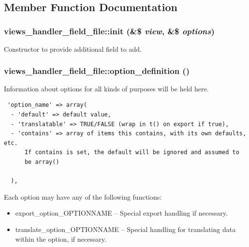 \subsection{Member Function Documentation}
\hypertarget{classviews__handler__field__file_a0c76118aaf12d0938111d093411c016}{
\subsubsection[{init}]{\setlength{\rightskip}{0pt plus 5cm}views\_\-handler\_\-field\_\-file::init (\&\$ {\em view}, \/  \&\$ {\em options})}}
\label{classviews__handler__field__file_a0c76118aaf12d0938111d093411c016}


Constructor to provide additional field to add. \hypertarget{classviews__handler__field__file_0bf24a6e9139daa5206f209b39aea824}{
\subsubsection[{option\_\-definition}]{\setlength{\rightskip}{0pt plus 5cm}views\_\-handler\_\-field\_\-file::option\_\-definition ()}}
\label{classviews__handler__field__file_0bf24a6e9139daa5206f209b39aea824}


Information about options for all kinds of purposes will be held here. 

\begin{Code}\begin{verbatim} 'option_name' => array(
  - 'default' => default value,
  - 'translatable' => TRUE/FALSE (wrap in t() on export if true),
  - 'contains' => array of items this contains, with its own defaults, etc.
      If contains is set, the default will be ignored and assumed to
      be array()

  ),
\end{verbatim}
\end{Code}

 Each option may have any of the following functions:\begin{itemize}
\item export\_\-option\_\-OPTIONNAME -- Special export handling if necessary.\item translate\_\-option\_\-OPTIONNAME -- Special handling for translating data within the option, if necessary. \end{itemize}


